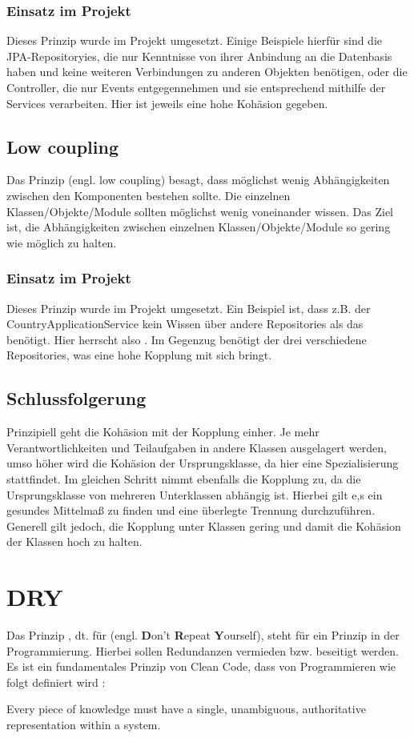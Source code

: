 				\subsubsection{Einsatz im Projekt}
				Dieses Prinzip wurde im Projekt umgesetzt. Einige Beispiele hierfür sind die JPA-Repositoryies, die nur Kenntnisse von ihrer Anbindung an die Datenbasis haben und keine weiteren Verbindungen zu anderen Objekten benötigen, oder die Controller, die nur Events entgegennehmen und sie entsprechend mithilfe der Services verarbeiten. Hier ist jeweils eine hohe Kohäsion gegeben.
			
			\subsection{Low coupling \cite{kohaesion.google}} \label{3.lowCoupling}
			Das Prinzip  (engl. low coupling) besagt, dass möglichst wenig Abhängigkeiten zwischen den Komponenten bestehen sollte. Die einzelnen Klassen/Objekte/Module sollten möglichst wenig voneinander wissen. Das Ziel ist, die Abhängigkeiten zwischen einzelnen Klassen/Objekte/Module so gering wie möglich zu halten.
				\subsubsection{Einsatz im Projekt}
				Dieses Prinzip wurde im Projekt umgesetzt. Ein Beispiel ist, dass z.B. der CountryApplicationService kein Wissen über andere Repositories als das  benötigt. Hier herrscht also . Im Gegenzug benötigt der  drei verschiedene Repositories, was eine hohe Kopplung mit sich bringt.
			
		\subsection{Schlussfolgerung}
		Prinzipiell geht die Kohäsion mit der Kopplung einher. Je mehr Verantwortlichkeiten und Teilaufgaben in andere Klassen ausgelagert werden, umso höher wird die Kohäsion der Ursprungsklasse, da hier eine Spezialisierung stattfindet. Im gleichen Schritt nimmt ebenfalls die Kopplung zu, da die Ursprungsklasse von mehreren Unterklassen abhängig ist. Hierbei gilt e,s ein gesundes Mittelmaß zu finden und eine überlegte Trennung durchzuführen. Generell gilt jedoch, die Kopplung unter Klassen gering und damit die Kohäsion der Klassen hoch zu halten.
		
	\section{DRY}
	Das Prinzip , dt. für  (engl. \textbf{D}on't \textbf{R}epeat \textbf{Y}ourself), steht für ein Prinzip in der Programmierung. Hierbei sollen Redundanzen vermieden bzw. beseitigt werden. Es ist ein fundamentales Prinzip von Clean Code, dass von Programmieren wie folgt definiert wird :
	\par Every piece of knowledge must have a single, unambiguous, authoritative representation within a system. \cite{dry.thevaluable}
	\\
